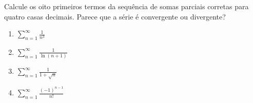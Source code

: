 \item\label{5}
Calcule os oito primeiros termos da sequência de somas parciais
corretas para quatro casas decimais. Parece que a série é convergente
ou divergente?

\begin{multicols}{2}
    \begin{enumerate}
        \item $\displaystyle \sum_{n=1}^{\infty} \frac{1}{n^3}$
        \item $\displaystyle \sum_{n=1}^{\infty} \frac{1}{\ln(n+1)}$
        \item $\displaystyle \sum_{n=1}^{\infty} \frac{1}{1 + \sqrt{n}}$
        \item $\displaystyle \sum_{n=1}^{\infty} \frac{(-1)^{n-1}}{n!}$
    \end{enumerate}
\end{multicols}